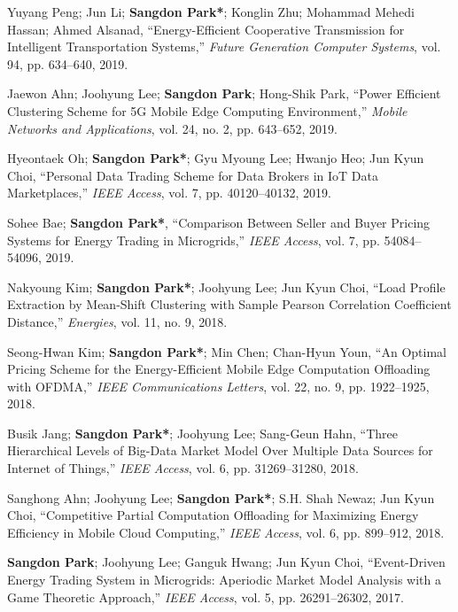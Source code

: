 \documentclass[11pt,a4paper]{article}
\begin{document}
\begin{enumerate}[label={[{\arabic*}]}, leftmargin=*, itemsep=0.3em]
\item Yuyang Peng; Jun Li; \textbf{Sangdon Park*}; Konglin Zhu; Mohammad Mehedi Hassan; Ahmed Alsanad, ``Energy-Efficient Cooperative Transmission for Intelligent Transportation Systems,'' \textit{Future Generation Computer Systems}, vol. 94, pp. 634--640, 2019.

\item Jaewon Ahn; Joohyung Lee; \textbf{Sangdon Park}; Hong-Shik Park, ``Power Efficient Clustering Scheme for 5G Mobile Edge Computing Environment,'' \textit{Mobile Networks and Applications}, vol. 24, no. 2, pp. 643--652, 2019.

\item Hyeontaek Oh; \textbf{Sangdon Park*}; Gyu Myoung Lee; Hwanjo Heo; Jun Kyun Choi, ``Personal Data Trading Scheme for Data Brokers in IoT Data Marketplaces,'' \textit{IEEE Access}, vol. 7, pp. 40120--40132, 2019.

\item Sohee Bae; \textbf{Sangdon Park*}, ``Comparison Between Seller and Buyer Pricing Systems for Energy Trading in Microgrids,'' \textit{IEEE Access}, vol. 7, pp. 54084--54096, 2019.

\item Nakyoung Kim; \textbf{Sangdon Park*}; Joohyung Lee; Jun Kyun Choi, ``Load Profile Extraction by Mean-Shift Clustering with Sample Pearson Correlation Coefficient Distance,'' \textit{Energies}, vol. 11, no. 9, 2018.

\item Seong-Hwan Kim; \textbf{Sangdon Park*}; Min Chen; Chan-Hyun Youn, ``An Optimal Pricing Scheme for the Energy-Efficient Mobile Edge Computation Offloading with OFDMA,'' \textit{IEEE Communications Letters}, vol. 22, no. 9, pp. 1922--1925, 2018.

\item Busik Jang; \textbf{Sangdon Park*}; Joohyung Lee; Sang-Geun Hahn, ``Three Hierarchical Levels of Big-Data Market Model Over Multiple Data Sources for Internet of Things,'' \textit{IEEE Access}, vol. 6, pp. 31269--31280, 2018.

\item Sanghong Ahn; Joohyung Lee; \textbf{Sangdon Park*}; S.H. Shah Newaz; Jun Kyun Choi, ``Competitive Partial Computation Offloading for Maximizing Energy Efficiency in Mobile Cloud Computing,'' \textit{IEEE Access}, vol. 6, pp. 899--912, 2018.

\item \textbf{Sangdon Park}; Joohyung Lee; Ganguk Hwang; Jun Kyun Choi, ``Event-Driven Energy Trading System in Microgrids: Aperiodic Market Model Analysis with a Game Theoretic Approach,'' \textit{IEEE Access}, vol. 5, pp. 26291--26302, 2017.


\end{enumerate}
\end{document}

